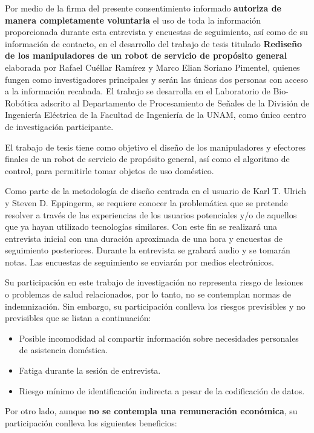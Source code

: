 \label{app:consentimiento}

Por medio de la firma del presente consentimiento informado \textbf{autoriza de manera completamente voluntaria} el uso de toda la información proporcionada durante esta entrevista y encuestas de seguimiento, así como de su información de contacto, en el desarrollo del trabajo de tesis titulado \textbf{Rediseño de los manipuladores de un robot de servicio de propósito general} elaborada por Rafael Cu\'ellar Ram\'irez y Marco Elian Soriano Pimentel, quienes fungen como investigadores principales y serán las únicas dos personas con acceso a la información recabada. El trabajo se desarrolla en el Laboratorio de Bio-Robótica adscrito al Departamento de Procesamiento de Señales de la División de Ingeniería Eléctrica de la Facultad de Ingeniería de la UNAM, como único centro de investigación participante.

El trabajo de tesis tiene como objetivo el diseño de los manipuladores y efectores finales de un robot de servicio de propósito general, así como el algoritmo de control, para permitirle tomar objetos de uso doméstico.

Como parte de la metodología de diseño centrada en el usuario de Karl T. Ulrich y Steven D. Eppingerm, se requiere conocer la problemática que se pretende resolver a través de las experiencias de los usuarios potenciales y/o de aquellos que ya hayan utilizado tecnologías similares. Con este fin se realizará una entrevista inicial con una duración aproximada de una hora y encuestas de seguimiento posteriores. Durante la entrevista se grabará audio y se tomarán notas. Las encuestas de seguimiento se enviarán por medios electrónicos.

Su participación en este trabajo de investigación no representa riesgo de lesiones o problemas de salud relacionados, por lo tanto, no se contemplan normas de indemnización. Sin embargo, su participación conlleva los riesgos previsibles y no previsibles que se listan a continuación: 

\begin{itemize}
\item Posible incomodidad al compartir información sobre necesidades personales de asistencia doméstica.
\item Fatiga durante la sesión de entrevista.
\item Riesgo mínimo de identificación indirecta a pesar de la codificación de datos.
\end{itemize}

Por otro lado, aunque \textbf{no se contempla una remuneración económica}, su participación conlleva los siguientes beneficios:

